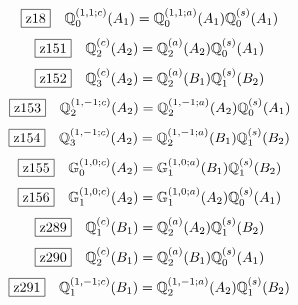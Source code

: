 \documentclass[fleqn,10pt,landscape]{jsarticle}
\begin{document}
\begin{dmath*}
\hspace*{3mm}\fbox{z18}\quad \mathbb{Q}_{0}^{(1,1;c)}(A_{1})=\mathbb{Q}_{0}^{(1,1;a)}(A_{1}) \mathbb{Q}_{0}^{(s)}(A_{1})
\end{dmath*}
\begin{dmath*}
\hspace*{3mm}\fbox{z151}\quad \mathbb{Q}_{2}^{(c)}(A_{2})=\mathbb{Q}_{2}^{(a)}(A_{2}) \mathbb{Q}_{0}^{(s)}(A_{1})
\end{dmath*}
\begin{dmath*}
\hspace*{3mm}\fbox{z152}\quad \mathbb{Q}_{3}^{(c)}(A_{2})=\mathbb{Q}_{2}^{(a)}(B_{1}) \mathbb{Q}_{1}^{(s)}(B_{2})
\end{dmath*}
\begin{dmath*}
\hspace*{3mm}\fbox{z153}\quad \mathbb{Q}_{2}^{(1,-1;c)}(A_{2})=\mathbb{Q}_{2}^{(1,-1;a)}(A_{2}) \mathbb{Q}_{0}^{(s)}(A_{1})
\end{dmath*}
\begin{dmath*}
\hspace*{3mm}\fbox{z154}\quad \mathbb{Q}_{3}^{(1,-1;c)}(A_{2})=\mathbb{Q}_{2}^{(1,-1;a)}(B_{1}) \mathbb{Q}_{1}^{(s)}(B_{2})
\end{dmath*}
\begin{dmath*}
\hspace*{3mm}\fbox{z155}\quad \mathbb{G}_{0}^{(1,0;c)}(A_{2})=\mathbb{G}_{1}^{(1,0;a)}(B_{1}) \mathbb{Q}_{1}^{(s)}(B_{2})
\end{dmath*}
\begin{dmath*}
\hspace*{3mm}\fbox{z156}\quad \mathbb{G}_{1}^{(1,0;c)}(A_{2})=\mathbb{G}_{1}^{(1,0;a)}(A_{2}) \mathbb{Q}_{0}^{(s)}(A_{1})
\end{dmath*}
\begin{dmath*}
\hspace*{3mm}\fbox{z289}\quad \mathbb{Q}_{1}^{(c)}(B_{1})=\mathbb{Q}_{2}^{(a)}(A_{2}) \mathbb{Q}_{1}^{(s)}(B_{2})
\end{dmath*}
\begin{dmath*}
\hspace*{3mm}\fbox{z290}\quad \mathbb{Q}_{2}^{(c)}(B_{1})=\mathbb{Q}_{2}^{(a)}(B_{1}) \mathbb{Q}_{0}^{(s)}(A_{1})
\end{dmath*}
\begin{dmath*}
\hspace*{3mm}\fbox{z291}\quad \mathbb{Q}_{1}^{(1,-1;c)}(B_{1})=\mathbb{Q}_{2}^{(1,-1;a)}(A_{2}) \mathbb{Q}_{1}^{(s)}(B_{2})
\end{dmath*}
\end{document}

